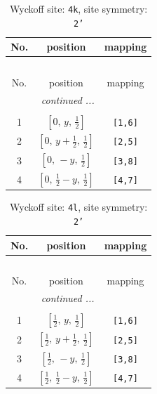 \documentclass[fleqn,8pt]{jsarticle}
\begin{document}
\renewcommand{\arraystretch}{1.2}
\begin{longtable}{ccc}
\caption{Wyckoff site: {\tt 4k}, site symmetry: {\tt 2'}}
 \\
 \hline \hline
No. & position & mapping \\ \hline \endfirsthead

\multicolumn{2}{l}{\tablename\ \thetable{}} \\
 \hline \hline
No. & position & mapping \\ \hline \endhead

 \hline \hline
\multicolumn{2}{r}{\footnotesize\it continued ...} \\ \endfoot

 \hline \hline
\multicolumn{2}{r}{} \\ \endlastfoot

1 & $\left[ 0,\, y,\, \frac{1}{2} \right]$ & {\tt [1,6]} \\ \hline
2 & $\left[ 0,\, y + \frac{1}{2},\, \frac{1}{2} \right]$ & {\tt [2,5]} \\ \hline
3 & $\left[ 0,\, - y,\, \frac{1}{2} \right]$ & {\tt [3,8]} \\ \hline
4 & $\left[ 0,\, \frac{1}{2} - y,\, \frac{1}{2} \right]$ & {\tt [4,7]} \\
\end{longtable}
\renewcommand{\arraystretch}{1.2}
\begin{longtable}{ccc}
\caption{Wyckoff site: {\tt 4l}, site symmetry: {\tt 2'}}
 \\
 \hline \hline
No. & position & mapping \\ \hline \endfirsthead

\multicolumn{2}{l}{\tablename\ \thetable{}} \\
 \hline \hline
No. & position & mapping \\ \hline \endhead

 \hline \hline
\multicolumn{2}{r}{\footnotesize\it continued ...} \\ \endfoot

 \hline \hline
\multicolumn{2}{r}{} \\ \endlastfoot

1 & $\left[ \frac{1}{2},\, y,\, \frac{1}{2} \right]$ & {\tt [1,6]} \\ \hline
2 & $\left[ \frac{1}{2},\, y + \frac{1}{2},\, \frac{1}{2} \right]$ & {\tt [2,5]} \\ \hline
3 & $\left[ \frac{1}{2},\, - y,\, \frac{1}{2} \right]$ & {\tt [3,8]} \\ \hline
4 & $\left[ \frac{1}{2},\, \frac{1}{2} - y,\, \frac{1}{2} \right]$ & {\tt [4,7]} \\
\end{longtable}
\end{document}

